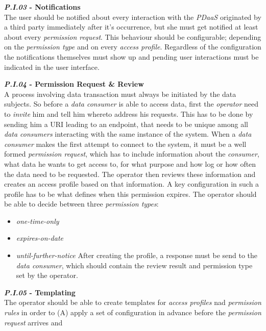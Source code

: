 \documentclass[12pt,english,a4paper,titlepage,cleardoublepage=empty,dottedtoc]{report}
\providecommand{\tightlist}{%
  \setlength{\itemsep}{0pt}\setlength{\parskip}{0pt}}
\begin{document}
\textbf{\emph{\protect\hypertarget{pi03}{}{P.I.03}} - Notifications}\\
The user should be notified about every interaction with the
\emph{PDaaS} originated by a third party immediately after it's
occurrence, but she must get notified at least about every
\emph{permission request}. This behaviour should be configurable;
depending on the \emph{permission type} and on every \emph{access
profile}. Regardless of the configuration the notifications themselves
must show up and pending user interactions must be indicated in the user
interface.

\textbf{\emph{\protect\hypertarget{pi04}{}{P.I.04}} - Permission Request
\& Review}\\
A process involving data transaction must always be initiated by the
data subjects. So before a \emph{data consumer} is able to access data,
first the \emph{operator} need to \emph{invite} him and tell him whereto
address his requests. This has to be done by sending him a URI leading
to an endpoint, that needs to be unique among all \emph{data consumers}
interacting with the same instance of the system. When a \emph{data
consumer} makes the first attempt to connect to the system, it must be a
well formed \emph{permission request}, which has to include information
about the \emph{consumer}, what data he wants to get access to, for what
purpose and how log or how often the data need to be requested. The
operator then reviews these information and creates an access profile
based on that information. A key configuration in such a profile has to
be what defines when this permission expires. The operator should be
able to decide between three \emph{permission types}:

\begin{itemize}
\tightlist
\item
  \emph{one-time-only}
\item
  \emph{expires-on-date}
\item
  \emph{until-further-notice} After creating the profile, a response
  must be send to the \emph{data consumer}, which should contain the
  review result and permission type set by the operator.
\end{itemize}

\textbf{\emph{\protect\hypertarget{pi05}{}{P.I.05}} - Templating}\\
The operator should be able to create templates for \emph{access
profiles} nad \emph{permission rules} in order to (A) apply a set of
configuration in advance before the \emph{permission request} arrives
and
\end{document}
